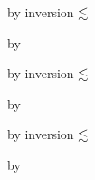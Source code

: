 {\begin{lamportproof*}
    \begin{pfproof}
        \begin{pfproof}
          by inversion $\lesssim$
        \end{pfproof}
      \qedstep
        \begin{pfproof}
          by \pfih
        \end{pfproof}
    \end{pfproof}

    \begin{pfproof}
        \begin{pfproof}
          by inversion $\lesssim$
        \end{pfproof}
      \qedstep
        \begin{pfproof}
          by \pfih
        \end{pfproof}
    \end{pfproof}

    \begin{pfproof}
        \begin{pfproof}
          by inversion $\lesssim$
        \end{pfproof}
      \qedstep
        \begin{pfproof}
          by \pfih
        \end{pfproof}
    \end{pfproof}

\end{lamportproof*}}

